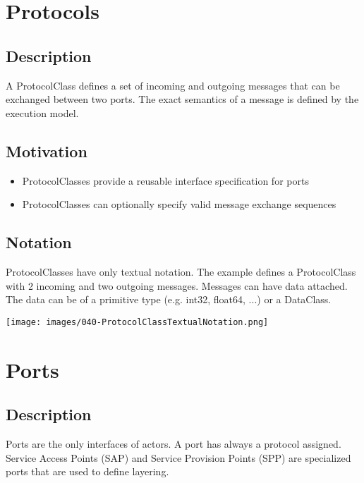 \section{Protocols}

\subsection{Description}

A ProtocolClass defines a set of incoming and outgoing messages that can be exchanged between two ports.
The exact semantics of a message is defined by the execution model.

\subsection{Motivation}

\begin{itemize}
\item ProtocolClasses provide a reusable interface specification for ports
\item ProtocolClasses can optionally specify valid message exchange sequences
\end{itemize}

\subsection{Notation}

ProtocolClasses have only textual notation. 
The example defines a ProtocolClass with 2 incoming and two outgoing messages. Messages can have data attached. The data can be of a primitive type (e.g. int32, float64, ...) or a DataClass.

\texttt{[image: images/040-ProtocolClassTextualNotation.png]}

\section{Ports}

\subsection{Description}

Ports are the only interfaces of actors. A port has always a protocol assigned. 
Service Access Points (SAP) and Service Provision Points (SPP) are specialized ports that are used to define layering.

